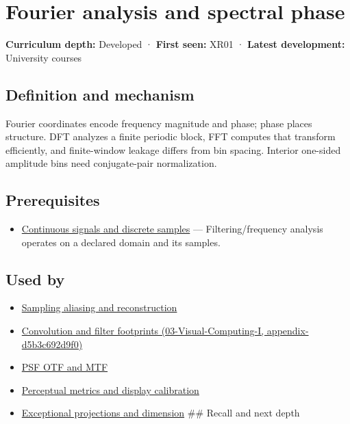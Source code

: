 \hypertarget{appendix-b60686ba06a1}{}
\section{Fourier analysis and spectral phase}\label{appendix-b60686ba06a1-fourier-analysis-and-spectral-phase}

\textbf{Curriculum depth:} Developed · \textbf{First seen:} XR01 · \textbf{Latest development:} University courses

\subsection{Definition and mechanism}\label{appendix-b60686ba06a1-definition-and-mechanism}

Fourier coordinates encode frequency magnitude and phase; phase places structure. DFT analyzes a finite periodic block, FFT computes that transform efficiently, and finite-window leakage differs from bin spacing. Interior one-sided amplitude bins need conjugate-pair normalization.

\subsection{Prerequisites}\label{appendix-b60686ba06a1-prerequisites}

\begin{itemize}
\tightlist
\item
  \hyperref[appendix-1077ea8fc737]{Continuous signals and discrete samples} --- Filtering/frequency analysis operates on a declared domain and its samples.
\end{itemize}

\subsection{Used by}\label{appendix-b60686ba06a1-used-by}

\begin{itemize}
\item
  \hyperref[appendix-6a7869dd79a6]{Sampling aliasing and reconstruction}
\item
  \href{../03-Visual-Computing-I/main.pdf\#nameddest=appendix-d5b3c692d9f0}{Convolution and filter footprints (03-Visual-Computing-I, appendix-d5b3c692d9f0)}
\item
  \hyperref[appendix-8b76b0efd27f]{PSF OTF and MTF}
\item
  \hyperref[appendix-b2c1846508bf]{Perceptual metrics and display calibration}
\item
  \hyperref[appendix-3c73f7862157]{Exceptional projections and dimension} \#\# Recall and next depth
\end{itemize}

